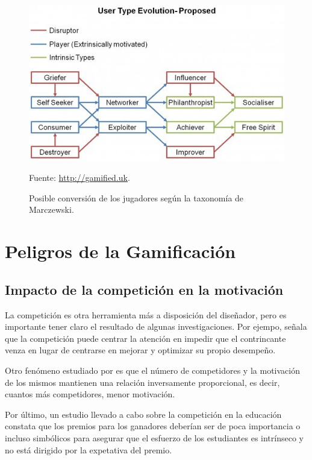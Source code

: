 \begin{figure}[hbtp]
\begin{center}
\caption{Posible conversión de los jugadores según la taxonomía de Marczewski.}
\label{fig::MarczewskiEvol}
\includegraphics[scale=0.65]{img/evolution.jpg}

\vspace{-0.25cm}
\small{Fuente: \url{http://gamified.uk}.}
\end{center}
\end{figure}
\FloatBarrier





\section{Peligros de la Gamificación}

\subsection{Impacto de la competición en la motivación}


La competición es otra herramienta más a disposición del diseñador, pero es importante tener claro el resultado de algunas investigaciones.
%
Por ejempo,  \cite{Crawford_CompetitionDef} señala que la competición puede centrar la atención en impedir que el contrincante venza en lugar de centrarse en mejorar y optimizar su propio desempeño.

Otro fenómeno estudiado por  \cite{n-effect} es que el número de competidores y la motivación de los mismos mantienen una relación inversamente proporcional, es decir, cuantos más competidores, menor motivación.

Por último, un estudio llevado a cabo sobre la competición en la educación  \cite{CompetitionInEd} constata que los premios para los ganadores deberían ser de poca importancia o incluso simbólicos para asegurar que el esfuerzo de los estudiantes es intrínseco y no está dirigido por la expetativa del premio.



